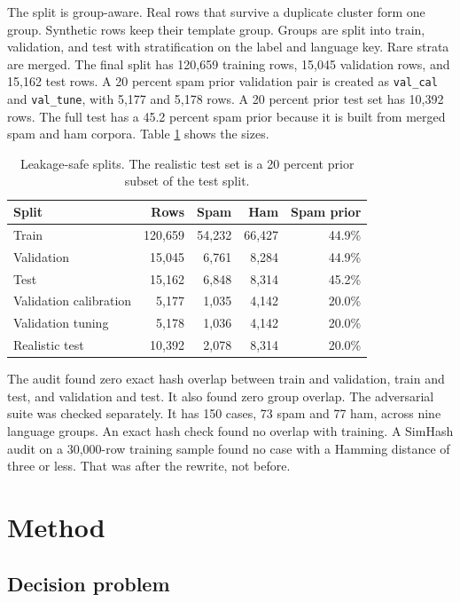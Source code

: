 \documentclass[11pt]{article}
\begin{document}
The split is group-aware. Real rows that survive a duplicate cluster form one group. Synthetic rows keep their template group. Groups are split into train, validation, and test with stratification on the label and language key. Rare strata are merged. The final split has 120,659 training rows, 15,045 validation rows, and 15,162 test rows. A 20 percent spam prior validation pair is created as \texttt{val\_cal} and \texttt{val\_tune}, with 5,177 and 5,178 rows. A 20 percent prior test set has 10,392 rows. The full test has a 45.2 percent spam prior because it is built from merged spam and ham corpora. Table \ref{tab:splits} shows the sizes.

\begin{table}[htbp]
\centering
\small
\caption{Leakage-safe splits. The realistic test set is a 20 percent prior subset of the test split.}
\label{tab:splits}
\begin{tabular}{lrrrr}
\toprule
Split & Rows & Spam & Ham & Spam prior \\
\midrule
Train & 120,659 & 54,232 & 66,427 & 44.9\% \\
Validation & 15,045 & 6,761 & 8,284 & 44.9\% \\
Test & 15,162 & 6,848 & 8,314 & 45.2\% \\
Validation calibration & 5,177 & 1,035 & 4,142 & 20.0\% \\
Validation tuning & 5,178 & 1,036 & 4,142 & 20.0\% \\
Realistic test & 10,392 & 2,078 & 8,314 & 20.0\% \\
\bottomrule
\end{tabular}
\end{table}

The audit found zero exact hash overlap between train and validation, train and test, and validation and test. It also found zero group overlap. The adversarial suite was checked separately. It has 150 cases, 73 spam and 77 ham, across nine language groups. An exact hash check found no overlap with training. A SimHash audit on a 30,000-row training sample found no case with a Hamming distance of three or less. That was after the rewrite, not before.

\section{Method}

\subsection{Decision problem}
\end{document}
